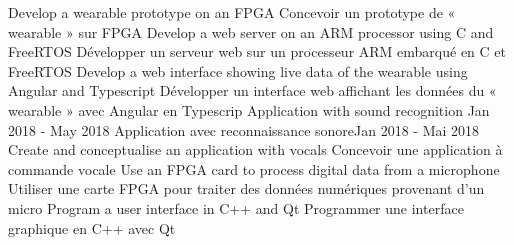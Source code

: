 \documentclass[letterpaper,11pt]{resume}
\begin{document}
          \resumeItemListStart
            \resumeItemEnFr
                {Develop a wearable prototype on an FPGA}
                {Concevoir un prototype de « wearable » sur FPGA}
            \resumeItemEnFr
                {Develop a web server on an ARM processor using C and FreeRTOS}
                {Développer un serveur web sur un processeur ARM embarqué en C et FreeRTOS}
            \resumeItemEnFr
                {Develop a web interface showing live data of the wearable using Angular and Typescript}
                {Développer un interface web affichant les données du « wearable » avec Angular en Typescrip}
          \resumeItemListEnd
      \resumeProjectHeadingEnFr
          {Application with sound recognition }{Jan 2018 - May 2018}
          {Application avec reconnaissance sonore}{Jan 2018 - Mai 2018}
          \resumeItemListStart
            \resumeItemEnFr
                {Create and conceptualise an application with vocals}
                {Concevoir une application à commande vocale}
            \resumeItemEnFr
                {Use an FPGA card to process digital data from a microphone}
                {Utiliser une carte FPGA pour traiter des données numériques provenant d’un micro}
            \resumeItemEnFr
                {Program a user interface in C++ and Qt}
                {Programmer une interface graphique en C++ avec Qt}
          \resumeItemListEnd
    \resumeSubHeadingListEnd
\end{document}
